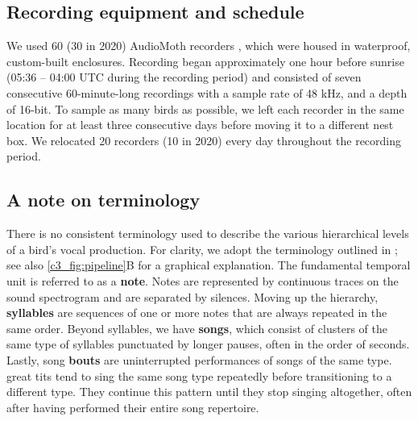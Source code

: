 \subsection{Recording equipment and schedule}

We used 60 (30 in 2020) AudioMoth recorders \parencite{hill2019}, which were housed in waterproof, custom-built enclosures. Recording began approximately one hour before sunrise (05:36 -- 04:00 UTC during the recording period) and consisted of seven consecutive 60-minute-long recordings with a sample rate of 48 kHz, and a depth of 16-bit. To sample as many birds as possible, we left each recorder in the same location for at least three consecutive days before moving it to a different nest box. We relocated 20 recorders (10 in 2020) every day throughout the recording period.

\begin{tcolorbox}[colback=tablegrey, boxrule=0pt, colframe=white, sharp corners] %
    \subsection{A note on terminology}
    There is no consistent terminology used to describe the various hierarchical levels of a bird's vocal production. For clarity, we adopt the terminology outlined in \cite{thompson1994}; see also \autoref{c3_fig:pipeline}B for a graphical explanation. 
    \medskip
    The fundamental temporal unit is referred to as a \textbf{note}. Notes are represented by continuous traces on the sound spectrogram and are separated by silences. Moving up the hierarchy, \textbf{syllables} are sequences of one or more notes that are always repeated in the same order. Beyond syllables, we have \textbf{songs}, which consist of clusters of the same type of syllables punctuated by longer pauses, often in the order of seconds. Lastly, song \textbf{bouts} are uninterrupted performances of songs of the same type. great tits tend to sing the same song type repeatedly before transitioning to a different type. They continue this pattern until they stop singing altogether, often after having performed their entire song repertoire.
\end{tcolorbox}

